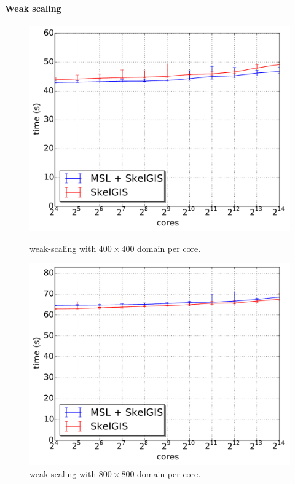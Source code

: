 \paragraph{\textbf{Weak scaling}}
\begin{figure}[t]
\begin{minipage}{.475\textwidth}
  \includegraphics[width=\textwidth]{../IJPP/results/weak_scaling/400/median_weak.pdf}
  \caption{weak-scaling with $400 \times 400$ domain per core.}
  \label{fig:weak1}
\end{minipage}
\hfill
\begin{minipage}{.475\textwidth}
  \includegraphics[width=\textwidth]{../IJPP/results/weak_scaling/800/median_weak.pdf}
  \caption{weak-scaling with $800 \times 800$ domain per core.}
  \label{fig:weak2}
\end{minipage}\end{figure}
